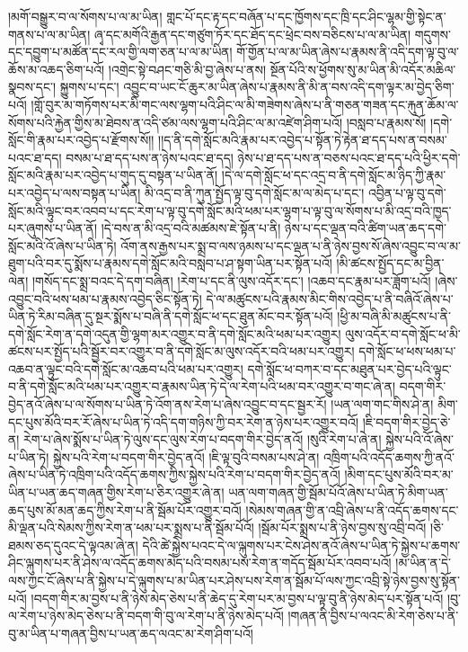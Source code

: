 །མགོ་བསྒྱུར་བ་ལ་སོགས་པ་ལ་མ་ཡིན། གླང་པོ་དང་རྟ་དང་བཞོན་པ་དང་ཁྱོགས་དང་ཁྲི་དང་ཤིང་ལྷམ་གྱི་སྟེང་ན་གནས་པ་ལ་མ་ཡིན། ཞྭ་དང་མགོའི་རྒྱན་དང་གཙུག་ཏོར་དང་ཐོད་དང་ཕྲེང་བས་བཅིངས་པ་ལ་མ་ཡིན། གདུགས་དང་དབྱུག་པ་མཚོན་དང་རལ་གྱི་ལག་ཅན་པ་ལ་མ་ཡིན། གོ་གྱོན་པ་ལ་མ་ཡིན་ཞེས་པ་རྣམས་ནི་འདི་དག་ལྟ་བུ་ལ་ཆོས་མ་འཆད་ཅིག་པའོ། །འགྲེང་སྟེ་བཤང་གཅི་མི་བྱ་ཞེས་པ་ནས། སྔོན་པོའི་ས་ཕྱོགས་སུ་མ་ཡིན་མི་འདོར་མཆིལ་སྣབས་དང་། སྐྱུགས་པ་དང་། འབྱུང་བ་ཡང་ངོ་ཆུར་མ་ཡིན་ཞེས་པ་རྣམས་ནི་མི་ན་བས་འདི་དག་ལྟར་མ་བྱེད་ཅིག་པའོ། །གློ་བུར་མ་གཏོགས་པར་མི་གང་ལས་ལྷག་པའི་ཤིང་ལ་མི་གཟེགས་ཞེས་པ་ནི་གཅན་གཟན་དང་རྐུན་ཆོམ་ལ་སོགས་པའི་རྐྱེན་གྱིས་མ་ཐེབས་ན་འདི་ཙམ་ལས་ལྷག་པའི་ཤིང་ལ་མ་འཛེག་ཤིག་པའོ། །བསླབ་པ་རྣམས་སོ། །དགེ་སློང་གི་རྣམ་པར་འབྱེད་པ་རྫོགས་སོ།། །།ད་ནི་དགེ་སློང་མའི་རྣམ་པར་འབྱེད་པ་སྟོན་ཏེ་རྟེན་ཐ་དད་པས་ན་བསམ་པའང་ཐ་དད། བསམ་པ་ཐ་དད་པས་ན་ཉེས་པའང་ཐ་དད། ཉེས་པ་ཐ་དད་པས་ན་བཅས་པའང་ཐ་དད་པའི་ཕྱིར་དགེ་སློང་མའི་རྣམ་པར་འབྱེད་པ་གུད་དུ་བསྟན་པ་ཡིན་ནོ། །དེ་ལ་དགེ་སློང་ཕ་དང་འདྲ་བ་ནི་དགེ་སློང་མ་ཉིད་ཀྱི་རྣམ་པར་འབྱེད་པ་ལས་བསྟན་པ་ཡིན། མི་འདྲ་བ་ནི་ཀུན་སྤྱོད་ལྟ་བུ་དགེ་སློང་མ་ལ་མེད་པ་དང་། འབྱིན་པ་ལྟ་བུ་དགེ་སློང་མའི་ལྟུང་བར་འབབ་པ་དང་རེག་པ་ལྟ་བུ་དགེ་སློང་མའི་ཕམ་པར་ལྷག་པ་ལྟ་བུ་ལ་སོགས་པ་མི་འདྲ་བའི་ཁྱད་པར་ཞུགས་པ་ཡིན་ནོ། །དེ་བས་ན་མི་འདྲ་བའི་མཚམས་ཇེ་སྟོན་པ་ནི། ཉེས་པ་དང་ལྡན་བའི་ཚིག་ཡན་ཆད་དགེ་སློང་མའི་འོ་ཞེས་པ་ཡིན་ཏེ། འོག་ནས་རྒྱས་པར་སྨྲ་བ་ལས་ཉམས་པ་དང་ལྡན་པ་ནི་ཉེས་བྱས་སོ་ཞེས་འབྱུང་བ་ལ་མ་ཐུག་པའི་བར་དུ་སྨོས་པ་རྣམས་དགེ་སློང་མའི་བསླབ་པ་ཤ་སྟག་ཡིན་པར་སྟོན་པའོ། །མི་ཚངས་སྤྱོད་དང་མ་བྱིན་ལེན། །གསོད་དང་སྨྲ་བའང་དེ་དག་བཞིན། །རེག་པ་དང་ནི་ལུས་འདོར་དང་། །འཆབ་དང་རྣམ་པར་ཟློག་པའོ། །ཞེས་འབྱུང་བའི་ཕས་ཕམ་པ་རྣམས་འབྱེད་ཅིང་སྟོན་ཏེ། དེ་ལ་མཚུངས་པའི་རྣམས་མིང་གིས་འབྱེད་པ་ནི་བཞིའོ་ཞེས་པ་ཡིན་ཏེ་རིམ་བཞིན་དུ་སྔར་སྨོས་པ་བཞི་ནི་དགེ་སློང་ཕ་དང་ཐུན་མོང་བར་སྟོན་པའོ། །ཕྱི་མ་བཞི་མི་མཚུངས་པ་ནི་དགེ་སློང་རེག་ན་དགེ་འདུན་གྱི་ལྷག་མར་འགྱུར་བ་ནི་དགེ་སློང་མའི་ཕམ་པར་འགྱུར། ལུས་འདོར་བ་དགེ་སློང་ཕ་མི་ཚངས་པར་སྤྱོད་པའི་སྦྱོར་བར་འགྱུར་བ་ནི་དགེ་སློང་མ་ལུས་འདོར་བའི་ཕམ་པར་འགྱུར། དགེ་སློང་ཕ་ཕས་ཕམ་པ་འཆབ་ན་ལྟུང་བའི་དགེ་སློང་མ་འཆབ་པའི་ཕམ་པར་འགྱུར། དགེ་སློང་ཕ་བཀར་བ་དང་མཐུན་པར་བྱེད་པའི་ལྟུང་བ་ནི་དགེ་སློང་མའི་ཕམ་པར་འགྱུར་བ་རྣམས་ཡིན་ཏེ་དེ་ལ་རེག་པའི་ཕམ་བར་འགྱུར་བ་གང་ཞེ་ན། བདག་གིར་བྱེད་ནའོ་ཞེས་པ་ལ་སོགས་པ་ཡིན་ཏེ་འོག་ནས་རེག་པ་ཞེས་འབྱུང་བ་དང་སྦྱར་རོ། །ཡན་ལག་གང་གིས་ཤེ་ན། མིག་དང་པུས་མོའི་བར་རོ་ཞེས་པ་ཡིན་ཏེ་འདི་དག་གཉིས་ཀྱི་བར་རེག་ན་ཉེས་པར་འགྱུར་བའོ། །ཇི་བདག་གིར་བྱེད་ཅེ་ན། རེག་པ་ཞེས་སྨོས་པ་ཡིན་ཏེ་ལུས་དང་ལུས་རེག་པ་བདག་གིར་བྱེད་ནའོ། །སུའི་རེག་པ་ཞེ་ན། སྐྱེས་པའི་འོ་ཞེས་པ་ཡིན་ཏེ། སྐྱེས་པའི་རེག་པ་བདག་གིར་བྱེད་ནའོ། །ཇི་ལྟ་བུའི་བསམ་པས་ཤེ་ན། འཁྲིག་པའི་འདོད་ཆགས་ཀྱི་ནའོ་ཞེས་པ་ཡིན་ཏེ་འཁྲིག་པའི་འདོད་ཆགས་ཀྱིས་སྐྱེས་པའི་རེག་པ་བདག་གིར་བྱེད་ནའོ། །མིག་དང་པུས་མོའི་བར་མ་ཡིན་པ་ཡན་ཆད་གཞན་གྱིས་རེག་པ་ཅིར་འགྱུར་ཞེ་ན། ཡན་ལག་གཞན་གྱི་སྦོམ་པོའོ་ཞེས་པ་ཡིན་ཏེ་མིག་ཡན་ཆད་པུས་མོ་མན་ཆད་ཀྱིས་རེག་པ་ནི་སྦོམ་པོར་འགྱུར་བའོ། །སེམས་གཞན་གྱི་ན་འབྲི་ཞེས་པ་ནི་འདོད་ཆགས་དང་མི་ལྡན་པའི་སེམས་ཀྱིས་རེག་ན་ཕམ་པར་སྨྲས་པ་ནི་སྦོམ་པོའོ། །སྦོམ་པོར་སྨྲས་པ་ནི་ཉེས་བྱས་སུ་འབྲི་བའོ། །ཅི་ཐམས་ཅད་དུའང་དེ་ལྟའམ་ཞེ་ན། དེའི་ཚེ་སྐྱེས་པའང་དེ་ལ་ལྐུགས་པར་ངེས་ཤེས་ནའོ་ཞེས་པ་ཡིན་ཏེ་སྐྱེས་པ་ཆགས་ཤིང་ལྐུགས་པར་ནི་ཤེས་ལ་འདོད་ཆགས་མེད་པའི་བསམ་པས་རེག་ན་གདོད་སྦོམ་པོར་འབབ་པའོ། །མ་ཡིན་ན་དེ་ལས་ཀྱང་ངོ་ཞེས་པ་ནི་སྐྱེས་པ་དེ་ལྐུགས་པ་མ་ཡིན་པར་ཤེས་པས་རེག་ན་སྦོམ་པོ་ལས་ཀྱང་འབྲི་སྟེ་ཉེས་བྱས་སུ་སྟོན་པའོ། །བདག་གིར་མ་བྱས་པ་ནི་ཉེས་མེད་ཅེས་པ་ནི་ཆེད་དུ་རེག་པར་མ་བྱས་པ་ལྟ་བུ་ནི་ཉེས་མེད་པར་སྟོན་པའོ། །བུ་ལ་རེག་པ་ཉེས་མེད་ཅེས་པ་ནི་བདག་གི་བུ་ལ་རེག་པ་ནི་ཉེས་མེད་པའོ། །གཞན་ནི་བྱིས་པ་ལའང་མི་རེག་ཅེས་པ་ནི་བུ་མ་ཡིན་པ་གཞན་བྱིས་པ་ཡན་ཆད་ལའང་མ་རེག་ཤིག་པའོ། 